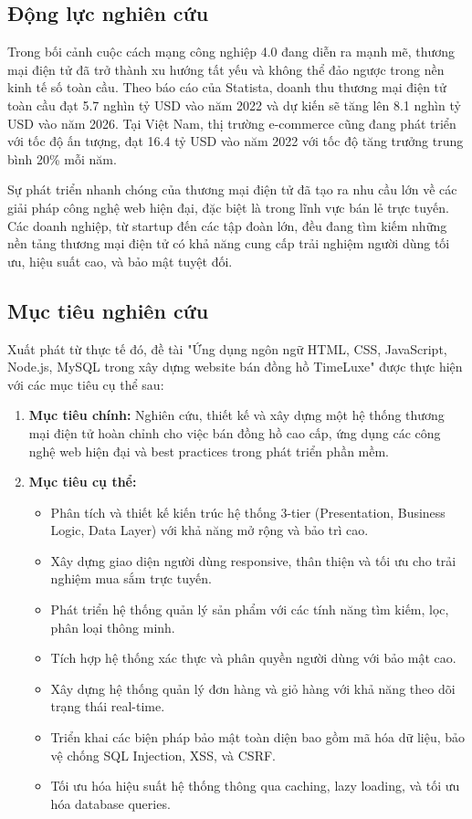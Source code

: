 \documentclass[a4paper,12pt]{report}
\begin{document}
\subsection*{Động lực nghiên cứu}

Trong bối cảnh cuộc cách mạng công nghiệp 4.0 đang diễn ra mạnh mẽ, thương mại điện tử đã trở thành xu hướng tất yếu và không thể đảo ngược trong nền kinh tế số toàn cầu. Theo báo cáo của Statista, doanh thu thương mại điện tử toàn cầu đạt 5.7 nghìn tỷ USD vào năm 2022 và dự kiến sẽ tăng lên 8.1 nghìn tỷ USD vào năm 2026. Tại Việt Nam, thị trường e-commerce cũng đang phát triển với tốc độ ấn tượng, đạt 16.4 tỷ USD vào năm 2022 với tốc độ tăng trưởng trung bình 20\% mỗi năm.

Sự phát triển nhanh chóng của thương mại điện tử đã tạo ra nhu cầu lớn về các giải pháp công nghệ web hiện đại, đặc biệt là trong lĩnh vực bán lẻ trực tuyến. Các doanh nghiệp, từ startup đến các tập đoàn lớn, đều đang tìm kiếm những nền tảng thương mại điện tử có khả năng cung cấp trải nghiệm người dùng tối ưu, hiệu suất cao, và bảo mật tuyệt đối.

\subsection*{Mục tiêu nghiên cứu}

Xuất phát từ thực tế đó, đề tài "Ứng dụng ngôn ngữ HTML, CSS, JavaScript, Node.js, MySQL trong xây dựng website bán đồng hồ TimeLuxe" được thực hiện với các mục tiêu cụ thể sau:

\begin{enumerate}
    \item \textbf{Mục tiêu chính:} Nghiên cứu, thiết kế và xây dựng một hệ thống thương mại điện tử hoàn chỉnh cho việc bán đồng hồ cao cấp, ứng dụng các công nghệ web hiện đại và best practices trong phát triển phần mềm.
    
    \item \textbf{Mục tiêu cụ thể:}
    \begin{itemize}
        \item Phân tích và thiết kế kiến trúc hệ thống 3-tier (Presentation, Business Logic, Data Layer) với khả năng mở rộng và bảo trì cao.
        \item Xây dựng giao diện người dùng responsive, thân thiện và tối ưu cho trải nghiệm mua sắm trực tuyến.
        \item Phát triển hệ thống quản lý sản phẩm với các tính năng tìm kiếm, lọc, phân loại thông minh.
        \item Tích hợp hệ thống xác thực và phân quyền người dùng với bảo mật cao.
        \item Xây dựng hệ thống quản lý đơn hàng và giỏ hàng với khả năng theo dõi trạng thái real-time.
        \item Triển khai các biện pháp bảo mật toàn diện bao gồm mã hóa dữ liệu, bảo vệ chống SQL Injection, XSS, và CSRF.
        \item Tối ưu hóa hiệu suất hệ thống thông qua caching, lazy loading, và tối ưu hóa database queries.
    \end{itemize}
\end{enumerate}
\end{document}
